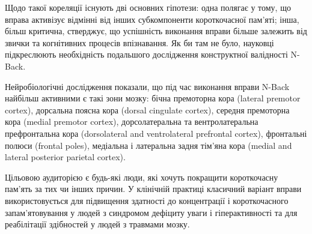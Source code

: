 Щодо такої кореляції існують дві основних гіпотези: одна полягає у тому, що вправа активізує відмінні від інших субкомпоненти короткочасної пам'яті; інша, більш критична, стверджує, що успішність виконання вправи більше залежить від звички та когнітивних процесів впізнавання. Як би там не було, науковці підкреслюють необхідність подальшого дослідження конструктної валідності N-Back.

Нейробіологічні дослідження показали, що під час виконання вправи N-Back найбільш активними є такі зони мозку: бічна премоторна кора (lateral premotor cortex), дорсальна поясна кора (dorsal cingulate cortex),  середня премоторна кора (medial premotor cortex), дорсолатеральна та вентролатеральна префронтальна кора (dorsolateral and ventrolateral prefrontal cortex), фронтальні полюси (frontal poles), медіальна і латеральна задня тім'яна кора (medial and lateral posterior parietal cortex).

\begin{comment}
У багатьох реалізаціях N-Back (наприклад, Brain Workshop) наявна конфігуруємість, у якій доступні ті чи інші модифікації класичної вправи. Якщо їх назвати мікромодифікаціями, то основну модифікацію даного продукту — просторовість — по відношенню до них можна буде назвати макромодифікацію у тому сенсі, що вона відкриває цілий вимір для нових мікромодифікацій.

Класичну вправу та деякий клас її мікромодифікацій можна узагальнити до K-N-Back, сутність якого полягає у тому, що користувачу послідовно показується ряд груп образів по K за раз, і на кожному кроці користувач повинен визначити, які з поточно-показаних K образів були показані рівно N кроків назад, натиснувши відповідні кожному з них кнопки.

У найбільш поширеному варіанті вправи — Dual-N-Back — як можна здогадатися, K дорівнює 2. Як правило, образами у реалізації такого варіанту є візуальний — підсвічена клітина на дошці, та аудіо — озвучена літера.

У даному варіанті дошка є трьовимірною і має структуру кубіка Рубіка, тобто великого куба, що складається з менших. Кожна грань цього куба є дошкою для K-N-Back, а нові мікромодифікації полягають у можливості зіставлення трьовимірним рухам дошки інформації, яку користувач має прийняти до уваги.
\end{comment}

Цільовою аудиторією є будь-які люди, які хочуть покращити короткочасну пам'ять за тих чи інших причин. У клінічній практиці класичний варіант вправи використовується для підвищення здатності до концентрації і короткочасного запам'ятовування у людей з синдромом дефіциту уваги і гіперактивності та для реабілітації здібностей у людей з травмами мозку.

